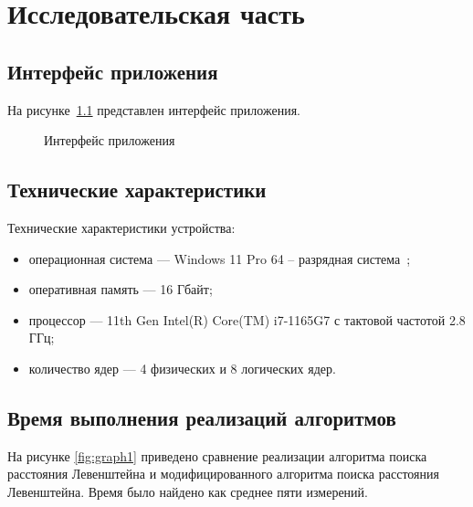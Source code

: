 \chapter{Исследовательская часть}

\section{Интерфейс приложения}

На рисунке~\ref{fig:interface} представлен интерфейс приложения.

\begin{figure}[h!]
	\caption{Интерфейс приложения}
	\label{fig:interface}
\end{figure}

\section{Технические характеристики}

Технические характеристики устройства:

\begin{itemize}
	\item операционная система --- Windows 11 Pro 64 -- разрядная система~\cite{windows};
	\item оперативная память --- 16 Гбайт;
	\item процессор --- 11th Gen Intel(R) Core(TM) i7-1165G7 с тактовой частотой 2.8 ГГц;
	\item количество ядер --- 4 физических и 8 логических ядер.
\end{itemize}

\section{Время выполнения реализаций алгоритмов}

На рисунке \ref{fig:graph1} приведено сравнение реализации алгоритма поиска расстояния Левенштейна и модифицированного алгоритма поиска расстояния Левенштейна. 
Время было найдено как среднее пяти измерений.

